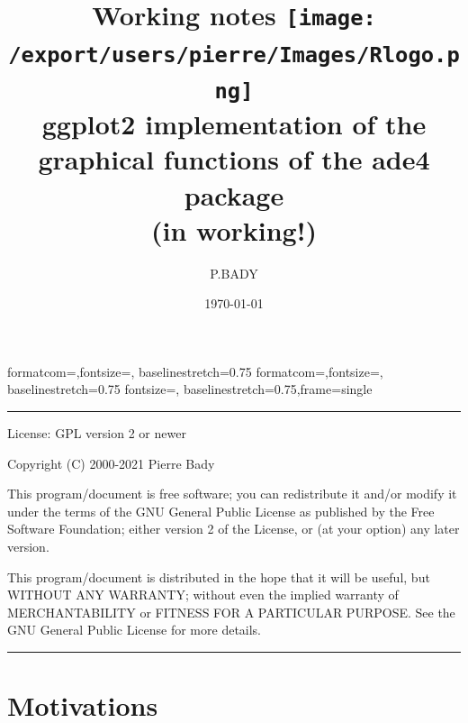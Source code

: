 \documentclass[a4paper,10pt]{article}
\title{\textbf{Working notes} \texttt{[image: /export/users/pierre/Images/Rlogo.png]}\\ggplot2 implementation of the graphical functions of the ade4 package\\(in working!)}
\author{P.BADY}
\date\today
\begin{document}

{formatcom={\color{Sinput}},fontsize=\footnotesize, baselinestretch=0.75}
{formatcom={\color{Soutput}},fontsize=\footnotesize, baselinestretch=0.75}
{fontsize=\footnotesize, baselinestretch=0.75,frame=single}
\renewenvironment{Schunk}{\vspace{\topsep}}{\vspace{\topsep}}


\maketitle


\newlength\tindent
\setlength{\tindent}{\parindent}
\setlength{\parindent}{0pt}
\renewcommand{\indent}{\hspace*{\tindent}}


\rule{\linewidth}{.5pt}
\begin{center}
\begin{minipage}{0.9\textwidth}
\fontfamily{\ttdefault}\selectfont
License: GPL version 2 or newer

Copyright (C) 2000-2021  Pierre Bady

This program/document is free software; you can redistribute it and/or modify it under the terms of the GNU General Public License as published by the Free Software Foundation; either version 2 of the License, or (at your option) any later version.

This program/document is distributed in the hope that it will be useful, but WITHOUT ANY WARRANTY; without even the implied warranty of MERCHANTABILITY or FITNESS FOR A PARTICULAR PURPOSE.  See the GNU General Public License for more details.
\end{minipage}\;
\end{center}
\rule{\linewidth}{.5pt}


\tableofcontents


\section{Motivations}
\end{document}
